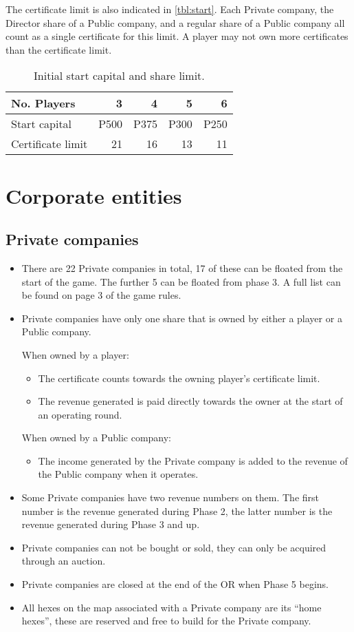 \documentclass[a4paper,twocolumn]{article}
\begin{document}
The certificate limit is also indicated in \autoref{tbl:start}. Each Private
company, the Director share of a Public company, and a regular share of a Public
company all count as a single certificate for this limit. A player may not own
more certificates than the certificate limit.

\begin{table}
	\centering
	\caption{Initial start capital and share limit.}
	\label{tbl:start}
	\begin{tabular}{l|r|r|r|r}
	No. Players & 3 & 4 & 5 & 6 \\ \hline
	Start capital & P500 & P375 & P300 & P250 \\
	Certificate limit & 21 & 16 & 13 & 11 \\
	\end{tabular}
\end{table}

\section{Corporate entities}
\subsection{Private companies}
\begin{itemize}
	\item There are 22 Private companies in total, 17 of these can be floated
	from the start of the game. The further 5 can be floated from phase 3. A
	full list can be found on page 3 of the game rules.
	\item Private companies have only one share that is owned by either a player
	or a Public company.
	
	When owned by a player:
	\begin{itemize}
		\item The certificate counts towards the owning player's certificate
		limit.
		\item The revenue generated is paid directly towards the owner at the
		start of an operating round.
	\end{itemize}
	When owned by a Public company:
	\begin{itemize}
		\item The income generated by the Private company is added to the
		revenue of the Public company when it operates.
	\end{itemize}
	
	\item Some Private companies have two revenue numbers on them. The first
	number is the revenue generated during Phase 2, the latter number is the
	revenue generated during Phase 3 and up.
	\item Private companies can not be bought or sold, they can only be acquired
	through an auction.
	\item Private companies are closed at the end of the OR when Phase 5 begins.
	\item All hexes on the map associated with a Private company are its ``home
	hexes'', these are reserved and free to build for the Private company.
\end{itemize}
\end{document}
